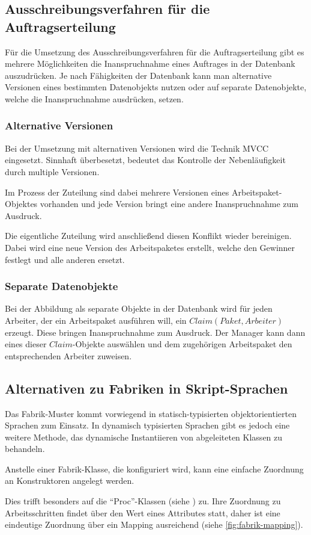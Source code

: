 \subsection{Ausschreibungsverfahren für die Auftragserteilung}
\label{sec:verfahren:erteilung}

Für die Umsetzung des Ausschreibungsverfahren für die Auftragserteilung gibt es
mehrere Möglichkeiten die Inanspruchnahme eines Auftrages in
der Datenbank auszudrücken. Je nach Fähigkeiten der Datenbank kann man 
alternative Versionen eines bestimmten Datenobjekts nutzen
oder auf separate Datenobjekte, welche die Inanspruchnahme ausdrücken, setzen.

\subsubsection{Alternative Versionen}

Bei der Umsetzung mit alternativen Versionen wird die Technik \ac{MVCC} eingesetzt.
Sinnhaft überbesetzt, bedeutet das Kontrolle der Nebenläufigkeit durch multiple Versionen.

Im Prozess der Zuteilung sind dabei mehrere Versionen eines Arbeitspaket-Objektes vorhanden und jede Version bringt eine andere Inanspruchnahme zum Ausdruck.

Die eigentliche Zuteilung wird anschließend diesen Konflikt wieder bereinigen.
Dabei wird eine neue Version des Arbeitspaketes erstellt, welche den Gewinner festlegt und alle anderen ersetzt.

\subsubsection{Separate Datenobjekte}

Bei der Abbildung als separate Objekte in der Datenbank
wird für jeden Arbeiter, der ein Arbeitspaket ausführen will, ein $Claim (Paket, Arbeiter)$ erzeugt. Diese bringen Inanspruchnahme zum Ausdruck.
Der Manager kann dann eines dieser $Claim$-Objekte auswählen und dem zugehörigen Arbeitspaket den entsprechenden Arbeiter zuweisen.

\subsection{Alternativen zu Fabriken in Skript-Sprachen}

Das Fabrik-Muster kommt vorwiegend in statisch-typisierten objektorientierten Sprachen zum Einsatz. In dynamisch typisierten Sprachen gibt es jedoch eine weitere Methode, das dynamische Instantiieren von abgeleiteten Klassen zu behandeln.

Anstelle einer Fabrik-Klasse, die konfiguriert wird,
kann eine einfache Zuordnung an Konstruktoren angelegt werden.

Dies trifft besonders auf die ``Proc''-Klassen (siehe ) zu.
Ihre Zuordnung zu Arbeitsschritten findet über den Wert eines Attributes statt,
daher ist eine eindeutige Zuordnung über ein Mapping ausreichend (siehe \cref{fig:fabrik-mapping}).

